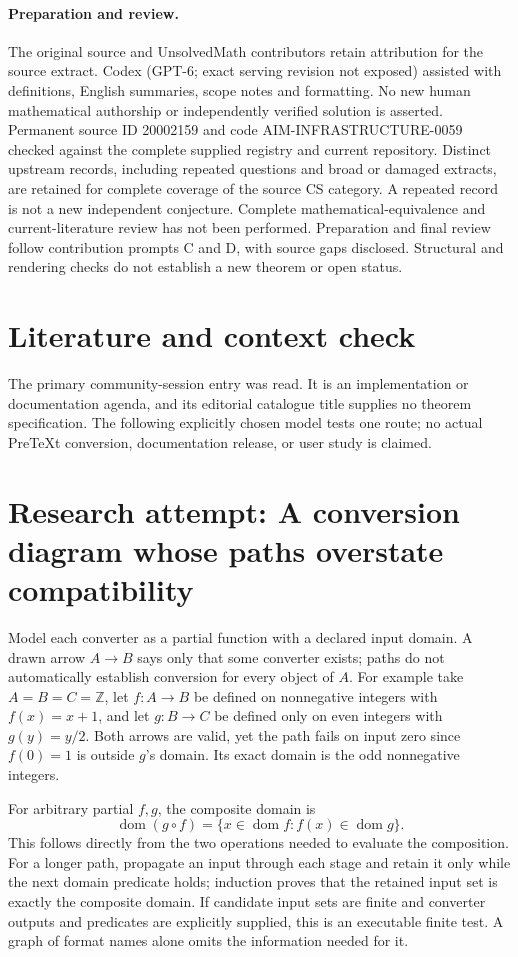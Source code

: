 \documentclass[11pt]{article}
\begin{document}
\paragraph{Preparation and review.}
The original source and UnsolvedMath contributors retain attribution for the source extract. Codex (GPT-6; exact serving revision not exposed) assisted with definitions, English summaries, scope notes and formatting. No new human mathematical authorship or independently verified solution is asserted. Permanent source ID 20002159 and code AIM-INFRASTRUCTURE-0059 checked against the complete supplied registry and current repository. Distinct upstream records, including repeated questions and broad or damaged extracts, are retained for complete coverage of the source CS category. A repeated record is not a new independent conjecture. Complete mathematical-equivalence and current-literature review has not been performed. Preparation and final review follow contribution prompts C and D, with source gaps disclosed. Structural and rendering checks do not establish a new theorem or open status.
\label{end:20002159}

\section{Literature and context check}
The primary community-session entry was read. It is an implementation or documentation agenda, and its editorial catalogue title supplies no theorem specification. The following explicitly chosen model tests one route; no actual PreTeXt conversion, documentation release, or user study is claimed.
\section{Research attempt: A conversion diagram whose paths overstate compatibility}
Model each converter as a partial function with a declared input domain. A drawn arrow $A\to B$ says only that some converter exists; paths do not automatically establish conversion for every object of $A$. For example take $A=B=C=\mathbb Z$, let $f:A\to B$ be defined on nonnegative integers with $f(x)=x+1$, and let $g:B\to C$ be defined only on even integers with $g(y)=y/2$. Both arrows are valid, yet the path fails on input zero since $f(0)=1$ is outside $g$'s domain. Its exact domain is the odd nonnegative integers.

For arbitrary partial $f,g$, the composite domain is
\[
\operatorname{dom}(g\circ f)=\{x\in\operatorname{dom}f:f(x)\in\operatorname{dom}g\}.
\]
This follows directly from the two operations needed to evaluate the composition. For a longer path, propagate an input through each stage and retain it only while the next domain predicate holds; induction proves that the retained input set is exactly the composite domain. If candidate input sets are finite and converter outputs and predicates are explicitly supplied, this is an executable finite test. A graph of format names alone omits the information needed for it.
\end{document}
